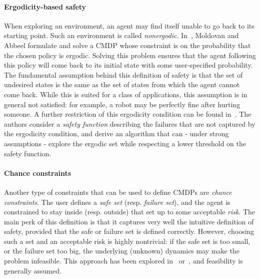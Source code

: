 		\paragraph{Ergodicity-based safety} When exploring an environment, an agent may find itself unable to go back to its starting point. Such an environment is called \emph{nonergodic}. In~\cite{moldovan2012safe}, Moldovan and Abbeel formulate and solve a CMDP whose constraint is on the probability that the chosen policy is ergodic. Solving this problem ensures that the agent following this policy will come back to its initial state with some user-specified probability. The fundamental assumption behind this definition of safety is that the set of undesired states is the same as the set of states from which the agent cannot come back. While this is suited for a class of applications, this assumption is in general not satisfied: for example, a robot may be perfectly fine after hurting someone. A further restriction of this ergodicity condition can be found in~\cite{turchetta2016safe}. The authors consider a \emph{safety function} describing the failures that are not captured by the ergodicity condition, and derive an algorithm that can - under strong assumptions - explore the ergodic set while respecting a lower threshold on the safety function.
		
		\paragraph{Chance constraints} Another type of constraints that can be used to define CMDPs are\emph{ chance constraints}. The user defines a\emph{ safe set} (resp.\emph{ failure set}), and the agent is constrained to stay inside (resp. outside) that set up to some acceptable\emph{ risk}. The main perk of this definition is that it captures very well the intuitive definition of safety, provided that the safe or failure set is defined correctly. However, choosing such a set and an acceptable risk is highly nontrivial: if the safe set is too small, or the failure set too big, the underlying (unknown) dynamics may make the problem infeasible. This approach has been explored in~\cite{paternain2019safe} or~\cite{geibel2005risk}, and feasibility is generally assumed. 
		
